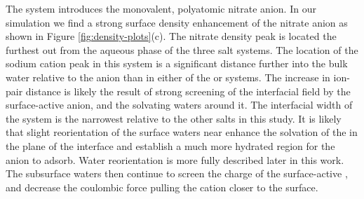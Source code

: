 The \sodnit system introduces the monovalent, polyatomic nitrate anion. In our simulation we find a strong surface density enhancement of the nitrate anion as shown in Figure \ref{fig:density-plots}(c). The nitrate density peak is located the furthest out from the aqueous phase of the three salt systems. The location of the sodium cation peak in this system is a significant distance further into the bulk water relative to the anion than in either of the \nacl or \sodsul systems. The increase in ion-pair distance is likely the result of strong screening of the interfacial field by the surface-active anion, and the solvating waters around it. The interfacial width of the \sodnit system is the narrowest relative to the other salts in this study. It is likely that slight reorientation of the surface waters near \ctc enhance the solvation of the \nit in the plane of the interface and establish a much more hydrated region for the anion to adsorb. Water reorientation is more fully described later in this work. The subsurface waters then continue to screen the charge of the surface-active \nit, and decrease the coulombic force pulling the cation closer to the surface. 



